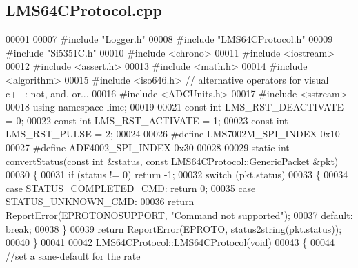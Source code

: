 \subsection{L\+M\+S64\+C\+Protocol.\+cpp}
\label{LMS64CProtocol_8cpp_source}

\begin{DoxyCode}
00001 
00007 \textcolor{preprocessor}{#include "Logger.h"}
00008 \textcolor{preprocessor}{#include "LMS64CProtocol.h"}
00009 \textcolor{preprocessor}{#include "Si5351C.h"}
00010 \textcolor{preprocessor}{#include <chrono>}
00011 \textcolor{preprocessor}{#include <iostream>}
00012 \textcolor{preprocessor}{#include <assert.h>}
00013 \textcolor{preprocessor}{#include <math.h>}
00014 \textcolor{preprocessor}{#include <algorithm>}
00015 \textcolor{preprocessor}{#include <iso646.h>} \textcolor{comment}{// alternative operators for visual c++: not, and, or...}
00016 \textcolor{preprocessor}{#include <ADCUnits.h>}
00017 \textcolor{preprocessor}{#include <sstream>}
00018 \textcolor{keyword}{using namespace }lime;
00019 
00021 \textcolor{keyword}{const} \textcolor{keywordtype}{int} LMS_RST_DEACTIVATE = 0;
00022 \textcolor{keyword}{const} \textcolor{keywordtype}{int} LMS_RST_ACTIVATE = 1;
00023 \textcolor{keyword}{const} \textcolor{keywordtype}{int} LMS_RST_PULSE = 2;
00024 
00026 \textcolor{preprocessor}{#define LMS7002M\_SPI\_INDEX 0x10}
00027 \textcolor{preprocessor}{#define ADF4002\_SPI\_INDEX 0x30}
00028 
00029 \textcolor{keyword}{static} \textcolor{keywordtype}{int} convertStatus(\textcolor{keyword}{const} \textcolor{keywordtype}{int} &status, \textcolor{keyword}{const} LMS64CProtocol::GenericPacket &pkt)
00030 \{
00031     \textcolor{keywordflow}{if} (status != 0) \textcolor{keywordflow}{return} -1;
00032     \textcolor{keywordflow}{switch} (pkt.status)
00033     \{
00034     \textcolor{keywordflow}{case} STATUS_COMPLETED_CMD: \textcolor{keywordflow}{return} 0;
00035     \textcolor{keywordflow}{case} STATUS_UNKNOWN_CMD:
00036         \textcolor{keywordflow}{return} ReportError(EPROTONOSUPPORT, \textcolor{stringliteral}{"Command not supported"});
00037     \textcolor{keywordflow}{default}: \textcolor{keywordflow}{break};
00038     \}
00039     \textcolor{keywordflow}{return} ReportError(EPROTO, status2string(pkt.status));
00040 \}
00041 
00042 LMS64CProtocol::LMS64CProtocol(\textcolor{keywordtype}{void})
00043 \{
00044     \textcolor{comment}{//set a sane-default for the rate}

\end{DoxyCode}
